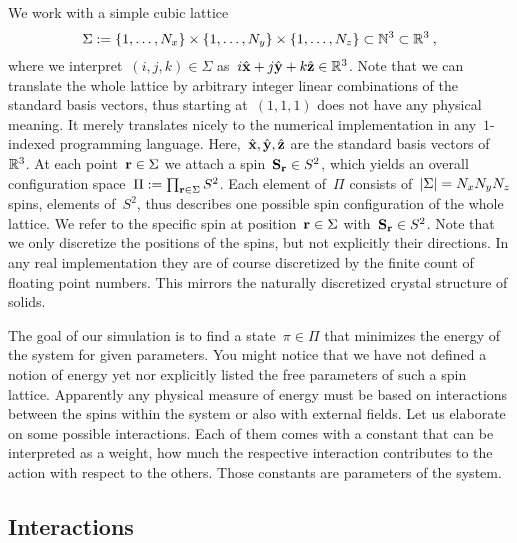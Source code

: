 We work with a simple cubic lattice
%
\begin{equation}
  \Sigma := \{1,\dots,N_x\} \times \{1,\dots,N_y\} \times
  \{1,\dots,N_z\} \subset \mathbb{N}^3 \subset \mathbb{R}^3\:,
\end{equation}
%
where we interpret~$(i,j,k) \in \Sigma$ as~$i \hat{\mathbf{x}} + j \hat{\mathbf{y}} + k \hat{\mathbf{z}}
\in \mathbb{R}^3$. Note that we can translate the whole lattice by arbitrary integer
linear combinations of the standard basis vectors, thus starting at~$(1,1,1)$
does not have any physical meaning. It merely translates nicely to the numerical
implementation in any~$1$-indexed programming language. Here,~$\hat{\mathbf{x}},
\hat{\mathbf{y}}, \hat{\mathbf{z}}$ are the standard basis vectors of~$\mathbb{R}^3$. At each point~$\mathbf{r}
\in \Sigma$ we attach a spin~$\mathbf{S}_{\mathbf{r}} \in S^2$, which yields an overall
configuration space~$\Pi := \prod_{\mathbf{r} \in \Sigma} S^2$.  Each element of~$\Pi$
consists of~$\abs{\Sigma}=N_x N_y N_z$ spins, \ie{} elements of~$S^2$, thus
describes one possible spin configuration of the whole lattice. We refer to the
specific spin at position~$\mathbf{r} \in \Sigma$ with~$\mathbf{S}_{\mathbf{r}} \in S^2$.  Note that we
only discretize the positions of the spins, but not explicitly their directions.
In any real implementation they are of course discretized by the finite count of
floating point numbers. This mirrors the naturally discretized crystal structure
of solids.


The goal of our simulation is to find a state~$\pi \in \Pi$ that minimizes the
energy of the system for given parameters. You might notice that we have not
defined a notion of energy yet nor explicitly listed the free parameters of such
a spin lattice. Apparently any physical measure of energy must be based on
interactions between the spins within the system or also with external fields.
Let us elaborate on some possible interactions. Each of them comes with a
constant that can be interpreted as a weight, \ie{} how much the respective
interaction contributes to the action with respect to the others. Those
constants are parameters of the system.

\subsection{Interactions}

